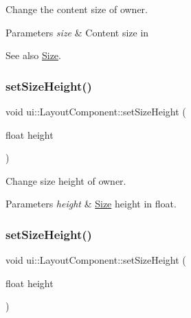 Change the content size of owner. 
\begin{DoxyParams}{Parameters}
{\em size} & Content size in \\
\hline
\end{DoxyParams}
\begin{DoxySeeAlso}{See also}
{\ttfamily \hyperlink{classSize}{Size}}. 
\end{DoxySeeAlso}
\mbox{\label{classui_1_1LayoutComponent_a88bc0e190fff80351071bbeceea9045f}} 
\subsubsection{\texorpdfstring{set\+Size\+Height()}{setSizeHeight()}\hspace{0.1cm}{\footnotesize\ttfamily [1/2]}}
{\footnotesize\ttfamily void ui\+::\+Layout\+Component\+::set\+Size\+Height (\begin{DoxyParamCaption}\item[{float}]{height }\end{DoxyParamCaption})}

Change size height of owner. 
\begin{DoxyParams}{Parameters}
{\em height} & \hyperlink{classSize}{Size} height in float. \\
\hline
\end{DoxyParams}
\mbox{\label{classui_1_1LayoutComponent_a88bc0e190fff80351071bbeceea9045f}} 
\subsubsection{\texorpdfstring{set\+Size\+Height()}{setSizeHeight()}\hspace{0.1cm}{\footnotesize\ttfamily [2/2]}}
{\footnotesize\ttfamily void ui\+::\+Layout\+Component\+::set\+Size\+Height (\begin{DoxyParamCaption}\item[{float}]{height }\end{DoxyParamCaption})}

